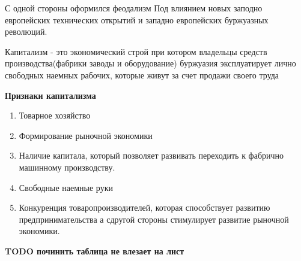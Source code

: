 \documentclass[a4paper]{article}
\begin{document}
С одной стороны оформился феодализм Под влиянием новых заподно европейских технических открытий и западно европейских буржуазных революций.

Капитализм - это экономический строй при котором владельцы средств производства(фабрики заводы и оборудование) буржуазия эксплуатирует лично свободных наемных рабочих, которые живут за счет продажи своего труда

\textbf{Признаки капитализма}
\begin{enumerate}
\item Товарное хозяйство
\item Формирование рыночной экономики
\item Наличие капитала, который позволяет развивать переходить к фабрично машинному производству.
\item Свободные наемные руки
\item Конкуренция товаропроизводителей, которая способствует развитию предпринимательства а сдругой стороны стимулирует развитие рыночной экономики.
\end{enumerate}
\textbf{TODO починить таблица не влезает на лист}
\end{document}
